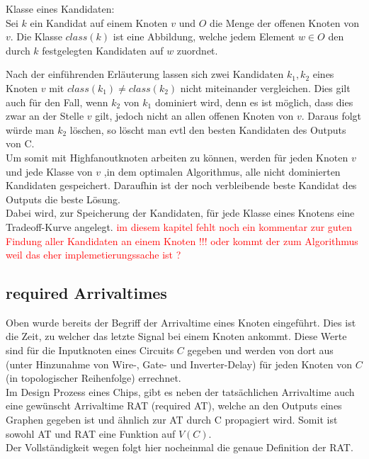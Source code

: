\documentclass[11pt, a4paper, german]{article}
\begin{document}
\begin{definition}{Klasse eines Kandidaten:}\\
	Sei $k$ ein Kandidat auf einem Knoten $v$ und $O$ die Menge der offenen Knoten von $v$. Die Klasse $class(k)$ ist eine Abbildung, welche jedem Element $w \in O$ den durch $k$ festgelegten Kandidaten auf $w$ zuordnet.\\
\end{definition}
Nach der einführenden Erläuterung lassen sich zwei Kandidaten $k_1,k_2$ eines Knoten $v$ mit $class(k_1) \neq class(k_2)$ nicht miteinander vergleichen. Dies gilt auch für den Fall, wenn $k_2$ von  $k_1$ dominiert wird, denn es ist möglich, dass dies zwar an der Stelle $v$ gilt, jedoch nicht an allen offenen Knoten von $v$. Daraus folgt würde man $k_2$ löschen, so löscht man evtl den besten Kandidaten des Outputs von C. \\
Um somit mit Highfanoutknoten arbeiten zu können, werden für jeden Knoten $v$ und jede Klasse von $v$ ,in dem optimalen Algorithmus, alle nicht dominierten Kandidaten gespeichert. Daraufhin ist der noch verbleibende beste Kandidat des Outputs die beste Lösung.\\
Dabei wird, zur Speicherung der Kandidaten, für jede Klasse eines Knotens eine Tradeoff-Kurve angelegt.
\textcolor{red}{im diesem kapitel fehlt noch ein kommentar zur guten Findung aller Kandidaten an einem Knoten !!! oder kommt der zum Algorithmus weil das eher implemetierungssache ist ?}

\subsection{required Arrivaltimes}
Oben wurde bereits der Begriff der Arrivaltime eines Knoten eingeführt. Dies ist die Zeit, zu welcher das letzte Signal bei einem Knoten ankommt. Diese Werte sind für die Inputknoten eines Circuits $C$ gegeben und werden von dort aus (unter Hinzunahme von Wire-, Gate- und Inverter-Delay) für jeden Knoten von $C$ (in topologischer Reihenfolge) errechnet.\\
Im Design Prozess eines Chips, gibt es neben der tatsächlichen Arrivaltime auch eine  gewünscht Arrivaltime RAT (required AT), welche an den Outputs eines Graphen gegeben ist und ähnlich zur AT durch C propagiert wird. Somit ist sowohl AT und RAT eine Funktion auf $V(C)$. \\
Der Vollständigkeit wegen folgt hier nocheinmal die genaue Definition der RAT.\\
\end{document}
